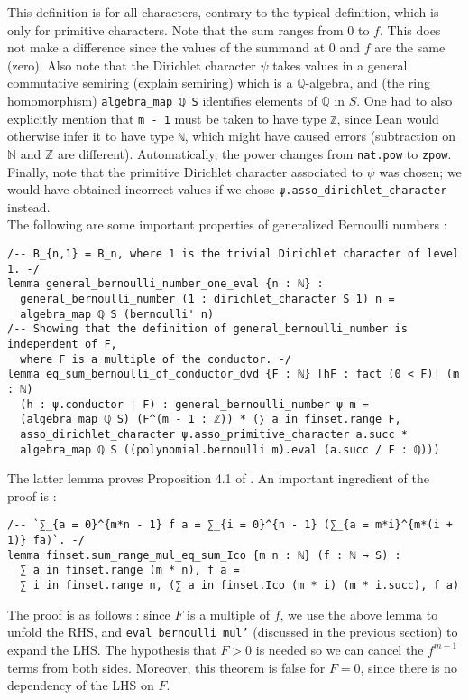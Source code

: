 \documentclass[11pt]{article}
\newcommand{\lean}[1]{\texttt{#1}\xspace} %
\begin{document}
This definition is for all characters, contrary to the typical definition, which is only for primitive characters. 
Note that the sum ranges from 0 to $f$. This does not make a difference since the 
values of the summand at 0 and $f$ are the same (zero). Also note that the Dirichlet 
character $\psi$ takes values in a general commutative semiring (explain semiring) 
which is a $\mathbb{Q}$-algebra, and (the ring homomorphism) \lean{algebra\_map ℚ S} 
identifies elements of $\mathbb{Q}$ in $S$. One had to also explicitly mention that 
\lean{m - 1} must be taken to have type \lean{ℤ}, since Lean would otherwise infer 
it to have type \lean{ℕ}, which might have caused errors (subtraction on $\mathbb{N}$ 
and $\mathbb{Z}$ are different). Automatically, the power changes from \lean{nat.pow} to 
\lean{zpow}. Finally, note that the primitive Dirichlet character associated to $\psi$ was 
chosen; we would have obtained incorrect values if we chose \lean{ψ.asso\_dirichlet\_character} instead. \\ 

The following are some important properties of generalized Bernoulli numbers : 
\begin{lstlisting}
/-- B_{n,1} = B_n, where 1 is the trivial Dirichlet character of level 1. -/
lemma general_bernoulli_number_one_eval {n : ℕ} :
  general_bernoulli_number (1 : dirichlet_character S 1) n = 
  algebra_map ℚ S (bernoulli' n) 
/-- Showing that the definition of general_bernoulli_number is independent of F,
  where F is a multiple of the conductor. -/
lemma eq_sum_bernoulli_of_conductor_dvd {F : ℕ} [hF : fact (0 < F)] (m : ℕ) 
  (h : ψ.conductor | F) : general_bernoulli_number ψ m = 
  (algebra_map ℚ S) (F^(m - 1 : ℤ)) * (∑ a in finset.range F, 
  asso_dirichlet_character ψ.asso_primitive_character a.succ *
  algebra_map ℚ S ((polynomial.bernoulli m).eval (a.succ / F : ℚ))) 
\end{lstlisting}

The latter lemma proves Proposition 4.1 of \cite{cyc}. An important ingredient of the proof is : 
\begin{lstlisting}
/-- `∑_{a = 0}^{m*n - 1} f a = ∑_{i = 0}^{n - 1} (∑_{a = m*i}^{m*(i + 1)} fa)`. -/
lemma finset.sum_range_mul_eq_sum_Ico {m n : ℕ} (f : ℕ → S) :
  ∑ a in finset.range (m * n), f a =
  ∑ i in finset.range n, (∑ a in finset.Ico (m * i) (m * i.succ), f a) 
\end{lstlisting}

The proof is as follows : since $F$ is a multiple of $f$, we use the above lemma to unfold the RHS, 
and \lean{eval\_bernoulli\_mul'} (discussed in the previous section) to expand the LHS. The hypothesis 
that $F > 0$ is needed so we can cancel the $f^{m - 1}$ terms from both sides. Moreover, this theorem is 
false for $F = 0$, since there is no dependency of the LHS on $F$. \\
\end{document}
